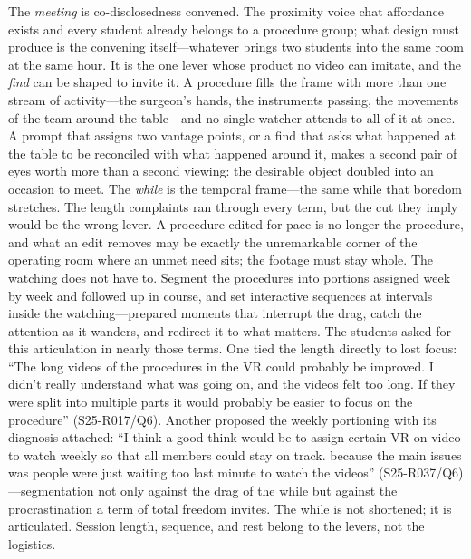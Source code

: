 The \textit{meeting} is co-disclosedness convened. The proximity voice
chat affordance exists and every student already belongs to a procedure
group; what design must produce is the convening itself---whatever
brings two students into the same room at the same hour. It is the one
lever whose product no video can imitate, and the \textit{find} can be
shaped to invite it. A procedure fills the frame with more than one
stream of activity---the surgeon's hands, the instruments passing, the
movements of the team around the table---and no single watcher attends
to all of it at once. A prompt that assigns two vantage points, or a
find that asks what happened at the table to be reconciled with what
happened around it, makes a second pair of eyes worth more than a
second viewing: the desirable object doubled into an occasion to meet.
The \textit{while} is the temporal frame---the same while that boredom
stretches. The length complaints ran through every term, but the cut
they imply would be the wrong lever. A procedure edited for pace is no
longer the procedure, and what an edit removes may be exactly the
unremarkable corner of the operating room where an unmet need sits;
the footage must stay whole. The watching does not have to. Segment
the procedures into portions assigned week by week and followed up in
course, and set interactive sequences at intervals inside the
watching---prepared moments that interrupt the drag, catch the
attention as it wanders, and redirect it to what matters. The students
asked for this articulation in nearly those terms. One tied the length
directly to lost focus: ``The long videos of the procedures in the VR
could probably be improved. I didn't really understand what was going on,
and the videos felt too long. If they were split into multiple parts it
would probably be easier to focus on the procedure'' (S25-R017/Q6).
Another proposed the weekly portioning with its diagnosis attached: ``I
think a good think would be to assign certain VR on video to watch weekly
so that all members could stay on track. because the main issues was
people were just waiting too last minute to watch the videos''
(S25-R037/Q6)---segmentation not only against the drag of the while but
against the procrastination a term of total freedom invites. The while is
not shortened; it is articulated. Session length, sequence, and rest
belong to the levers, not the logistics.

